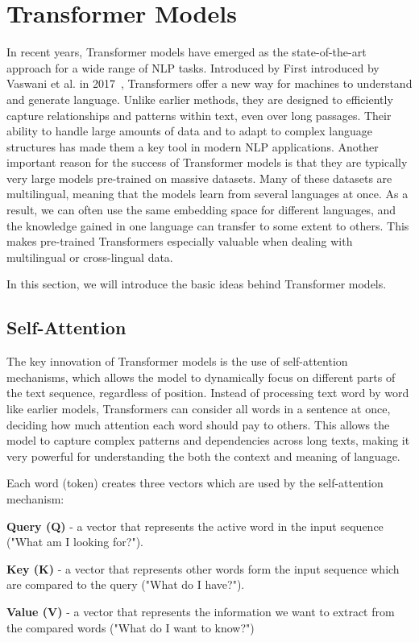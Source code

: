 \documentclass[twoside]{ctuthesis}
\theoremstyle{plain}
\theoremstyle{definition}
\theoremstyle{note}
\begin{document}
\section{Transformer Models}

In recent years, Transformer models have emerged as the state-of-the-art approach for a wide range of NLP tasks. Introduced by First introduced by Vaswani et al. in 2017~\cite{Vaswani2017}, Transformers offer a new way for machines to understand and generate language. Unlike earlier methods, they are designed to efficiently capture relationships and patterns within text, even over long passages. Their ability to handle large amounts of data and to adapt to complex language structures has made them a key tool in modern NLP applications.
Another important reason for the success of Transformer models is that they are typically very large models pre-trained on massive datasets. Many of these datasets are multilingual, meaning that the models learn from several languages at once. As a result, we can often use the same embedding space for different languages, and the knowledge gained in one language can transfer to some extent to others. This makes pre-trained Transformers especially valuable when dealing with multilingual or cross-lingual data.\par
In this section, we will introduce the basic ideas behind Transformer models.\par

\subsection{Self-Attention}

The key innovation of Transformer models is the use of self-attention mechanisms, which allows the model to dynamically focus on different parts of the text sequence, regardless of position. Instead of processing text word by word like earlier models, Transformers can consider all words in a sentence at once, deciding how much attention each word should pay to others. This allows the model to capture complex patterns and dependencies across long texts, making it very powerful for understanding the both the context and meaning of language.\par

Each word (token) creates three vectors which are used by the self-attention mechanism:
\begin{list}{}{}
	\itemsep=0pt
	\item \textbf{Query (Q)} - a vector that represents the active word in the input sequence ("What am I looking for?").
	\item \textbf{Key (K)} - a vector that represents other words form the input sequence which are compared to the query ("What do I have?").
	\item \textbf{Value (V)} - a vector that represents the information we want to extract from the compared words ("What do I want to know?")
\end{list}
\end{document}
